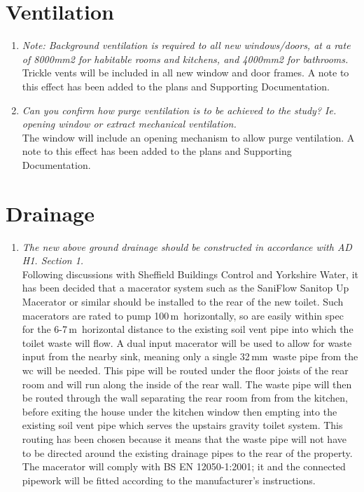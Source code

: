 \documentclass{extension}
\newcommand{\mm}{\,$\mathrm{mm}$}
\newcommand{\m}{\,$\mathrm{m}$}
\begin{document}
\section{Ventilation}
\begin{enumerate}
\item {\it Note: Background ventilation is required to all new windows/doors, at a rate of 8000mm2 for habitable rooms and kitchens, and 4000mm2 for bathrooms.}\\
Trickle vents will be included in all new window and door frames. A note to this effect has been added to the plans and Supporting Documentation.
\item {\it Can you confirm how purge ventilation is to be achieved to the study? Ie. opening window or extract mechanical ventilation.}\\
The window will include an opening mechanism to allow purge ventilation. A note to this effect has been added to the plans and Supporting Documentation.
\end{enumerate}

\section{Drainage}
\begin{enumerate}
\item {\it The new above ground drainage should be constructed in accordance with AD H1. Section 1.}\\
Following discussions with Sheffield Buildings Control and Yorkshire Water, it has been decided that a macerator system such as the SaniFlow Sanitop Up Macerator\cite{macerator} or similar should be installed to the rear of the new toilet. Such macerators are rated to pump 100\m\ horizontally, so are easily within spec for the 6-7\m\ horizontal distance to the existing soil vent pipe into which the toilet waste will flow. A dual input macerator will be used to allow for waste input from the nearby sink, meaning only a single 32\mm\ waste pipe from the wc will be needed. This pipe will be routed under the floor joists of the rear room and will run along the inside of the rear wall. The waste pipe will then be routed through the wall separating the rear room from from the kitchen, before exiting the house under the kitchen window then empting into the existing soil vent pipe which serves the upstairs gravity toilet system. This routing has been chosen because it means that the waste pipe will not have to be directed around the existing drainage pipes to the rear of the property. The macerator will comply with BS EN 12050-1:2001; it and the connected pipework will be fitted according to the manufacturer's instructions.
\end{enumerate}
\end{document}
